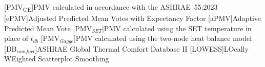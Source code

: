 \begin{acronym}[longest]
    [PMV\textsubscript{CE}]{PMV calculated in accordance with the ASHRAE~55:2023}
    [ePMV]{Adjusted Predicted Mean Votes with Expectancy Factor}
    [aPMV]{Adaptive Predicted Mean Vote}
    [PMV$_{SET}$]{PMV calculated using the SET temperature in place of $t_{db}$}
    [PMV$_{Gagge}$]{PMV calculated using the two-node heat balance model}
    [DB$_{comfort}$]{ASHRAE Global Thermal Comfort Database II}
    [LOWESS]{LOcally WEighted Scatterplot Smoothing}

\end{acronym}
\renewcommand{\baselinestretch}{1}\normalsize
